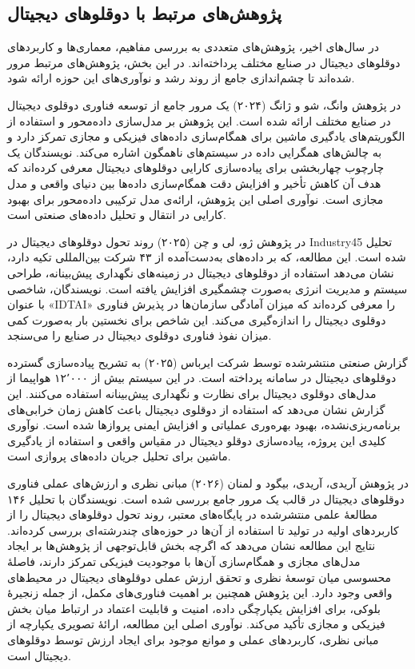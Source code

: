 \documentclass[a4paper,fleqn]{report}
\begin{document}
\subsection{پژوهش‌های مرتبط با دوقلوهای دیجیتال}

در سال‌های اخیر، پژوهش‌های متعددی به بررسی مفاهیم، معماری‌ها و کاربردهای دوقلوهای دیجیتال  در صنایع مختلف پرداخته‌اند. در این بخش، پژوهش‌های مرتبط مرور شده‌اند تا چشم‌اندازی جامع از روند رشد و نوآوری‌های این حوزه ارائه شود.


در پژوهش 
وانگ، شو و ژانگ (۲۰۲۴)
  \cite{wang2024digitaltwin} یک مرور جامع از توسعه فناوری دوقلوی دیجیتال در صنایع مختلف ارائه شده است. این پژوهش بر مدل‌سازی داده‌محور و استفاده از الگوریتم‌های یادگیری ماشین برای همگام‌سازی داده‌های فیزیکی و مجازی تمرکز دارد و به چالش‌های همگرایی داده در سیستم‌های ناهمگون اشاره می‌کند. نویسندگان یک چارچوب چهاربخشی برای پیاده‌سازی کارایی دوقلوهای دیجیتال معرفی کرده‌اند که هدف آن کاهش تأخیر و افزایش دقت همگام‌سازی داده‌ها بین دنیای واقعی و مدل مجازی است. نوآوری اصلی این پژوهش، ارائه‌ی مدل ترکیبی داده‌محور برای بهبود کارایی در انتقال و تحلیل داده‌های صنعتی است.

در پژوهش
ژو، لی و چن (۲۰۲۵)
 \cite{zhou2025newera} روند تحول دوقلوهای دیجیتال در \gls{Industry45} تحلیل شده است. این مطالعه، که بر داده‌های به‌دست‌آمده از ۴۳ شرکت بین‌المللی تکیه دارد، نشان می‌دهد استفاده از دوقلوهای دیجیتال در زمینه‌های نگهداری پیش‌بینانه، طراحی سیستم و مدیریت انرژی به‌صورت چشمگیری افزایش یافته است. نویسندگان، شاخصی با عنوان «\gls{IDTAI}» را معرفی کرده‌اند که میزان آمادگی سازمان‌ها در پذیرش فناوری دوقلوی دیجیتال را اندازه‌گیری می‌کند. این شاخص برای نخستین بار به‌صورت کمی میزان نفوذ فناوری دوقلوی دیجیتال در صنایع را می‌سنجد.

 

گزارش صنعتی منتشرشده توسط شرکت
ایرباس (۲۰۲۵)
\cite{airbus2025digitaltwins} به تشریح پیاده‌سازی گسترده دوقلوهای دیجیتال در سامانه 
 \lr{ } \cite{airbus2024skywisecorex}
  پرداخته است. در این سیستم بیش از ۱۲٬۰۰۰ هواپیما از مدل‌های دوقلوی دیجیتال برای نظارت و نگهداری پیش‌بینانه استفاده می‌کنند. این گزارش نشان می‌دهد که استفاده از دوقلوی دیجیتال باعث کاهش زمان خرابی‌های برنامه‌ریزی‌نشده، بهبود بهره‌وری عملیاتی و افزایش ایمنی پروازها شده است. نوآوری کلیدی این پروژه، پیاده‌سازی دوقلو دیجیتال در مقیاس واقعی و استفاده از یادگیری ماشین برای تحلیل جریان داده‌های پروازی است.


در پژوهش
آریدی، آریدی، بیگود و لمنان (۲۰۲۶)
\cite{aridi2026theoretical}
مبانی نظری و ارزش‌های عملی فناوری دوقلوهای دیجیتال در قالب یک مرور جامع بررسی شده است. نویسندگان با تحلیل ۱۴۶ مطالعهٔ علمی منتشرشده در پایگاه‌های معتبر، روند تحول دوقلوهای دیجیتال را از کاربردهای اولیه در تولید تا استفاده از آن‌ها در حوزه‌های چندرشته‌ای بررسی کرده‌اند. نتایج این مطالعه نشان می‌دهد که اگرچه بخش قابل‌توجهی از پژوهش‌ها بر ایجاد مدل‌های مجازی و همگام‌سازی آن‌ها با موجودیت فیزیکی تمرکز دارند، فاصلهٔ محسوسی میان توسعهٔ نظری و تحقق ارزش عملی دوقلوهای دیجیتال در محیط‌های واقعی وجود دارد. این پژوهش همچنین بر اهمیت فناوری‌های مکمل، از جمله زنجیرهٔ بلوکی، برای افزایش یکپارچگی داده، امنیت و قابلیت اعتماد در ارتباط میان بخش فیزیکی و مجازی تأکید می‌کند. نوآوری اصلی این مطالعه، ارائهٔ تصویری یکپارچه از مبانی نظری، کاربردهای عملی و موانع موجود برای ایجاد ارزش توسط دوقلوهای دیجیتال است.
\end{document}
